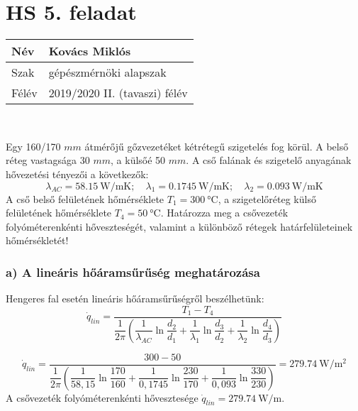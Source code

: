 \section*{HS 5. feladat} 

\begin{tabular}{ | p{2cm} | p{13cm} | } 
	\hline
	Név & Kovács Miklós \\ 
	\hline
	Szak & gépészmérnöki alapszak \\ 
	\hline
	Félév & 2019/2020 II. (tavaszi) félév \\ 
	\hline
\end{tabular}\\
\vspace{5mm}

Egy 160/170 $mm$ átmérőjű gőzvezetéket kétrétegű szigetelés fog körül. A belső réteg vastagsága 30 $mm$, a külsőé 50 $mm$. A cső falának és szigetelő anyagának hővezetési tényezői a következők:
\begin{equation*}
	\lambda_{AC} = \SI{58,15}{\watt\per\meter\kelvin};
	\quad
	\lambda_1 = \SI{0,1745}{\watt\per\meter\kelvin};
	\quad
	\lambda_2 = \SI{0,093}{\watt\per\meter\kelvin}
\end{equation*}
A cső belső felületének hőmérséklete $T_1 =\SI{300}{\celsius}$, a szigetelőréteg külső felületének hőmérséklete $T_4 =\SI{50}{\celsius}$. Határozza meg a csővezeték folyóméterenkénti hőveszteségét, valamint a különböző rétegek határfelületeinek hőmérsékletét!

\subsubsection*{a) A lineáris hőáramsűrűség meghatározása }
Hengeres fal esetén lineáris hőáramsűrűségről beszélhetünk:
\begin{equation*}
 \dot{q}_{lin} = \dfrac {T_1 - T_4}{\dfrac{1}{2 \pi} \left(\dfrac {1}{\lambda_{AC}} \ln \dfrac {d_2}{d_1}+\dfrac {1}{\lambda_{1}} \ln \dfrac {d_3}{d_2}+\dfrac {1}{\lambda_{2}} \ln \dfrac {d_4}{d_3}\right)} 
\end{equation*}

\begin{equation}
 \dot{q}_{lin} = \dfrac {300 - 50}{\dfrac{1}{2 \pi} \left(\dfrac {1}{58,15} \ln \dfrac {170}{160}+\dfrac {1}{0,1745} \ln \dfrac {230}{170}+\dfrac {1}{0,093} \ln \dfrac {330}{230}\right)} =\SI{279,74}{\watt\per\meter\squared}
\end{equation}
A csővezeték folyóméterenkénti hővesztesége $\dot{q}_{lin} = \SI{279,74}{\watt\per\meter}$.


